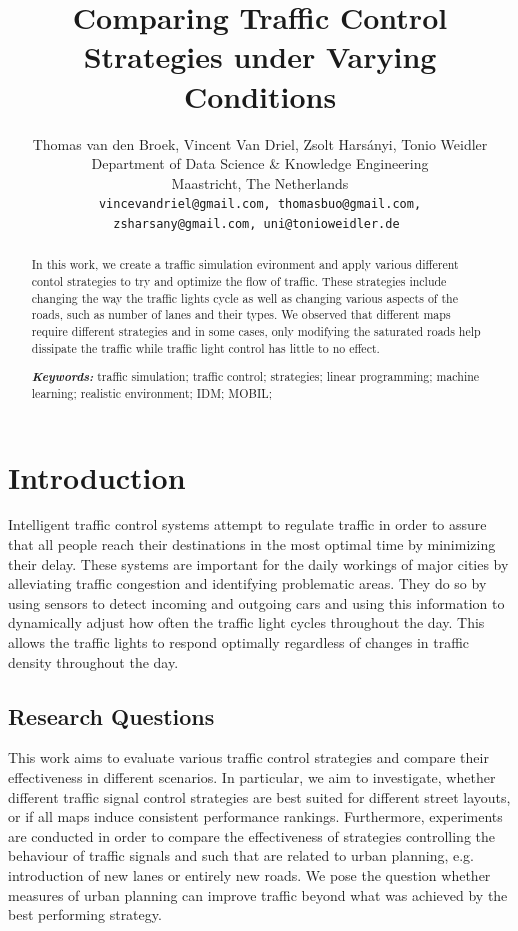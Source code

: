 \documentclass[11pt]{article}
\title{Comparing Traffic Control Strategies under Varying Conditions}
\author{Thomas van den Broek, Vincent Van Driel, Zsolt Harsányi, Tonio Weidler\\
	Department of Data Science \& Knowledge Engineering\\
	Maastricht, The Netherlands\\
	\tt \small vincevandriel@gmail.com, thomasbuo@gmail.com,\\
	\tt \small zsharsany@gmail.com, uni@tonioweidler.de
}
\begin{document}
\maketitle
\begin{abstract}
In this work, we create a traffic simulation evironment and apply various different contol strategies to try and optimize the flow of traffic. These strategies include changing the way the traffic lights cycle as well as changing various aspects of the roads, such as number of lanes and their types. We observed that different maps require different strategies and in some cases, only modifying the saturated roads help dissipate the traffic while traffic light control has little to no effect.

{{\it \bf Keywords:} traffic simulation; traffic control; strategies; linear programming; machine learning; realistic environment; IDM; MOBIL;}
\end{abstract}

\section{Introduction}
Intelligent traffic control systems attempt to regulate traffic in order to assure that all people reach their destinations in the most optimal time by minimizing their delay. These systems are important for the daily workings of major cities by alleviating traffic congestion and identifying problematic areas.  They do so by using sensors to detect incoming and outgoing cars and using this information to dynamically adjust how often the traffic light cycles throughout the day.  This allows the traffic lights to respond optimally regardless of changes in traffic density throughout the day.

\subsection{Research Questions}
This work aims to evaluate various traffic control strategies and compare their effectiveness in different scenarios. In particular, we aim to investigate, whether different traffic signal control strategies are best suited for different street layouts, or if all maps induce consistent performance rankings. Furthermore, experiments are conducted in order to compare the effectiveness of strategies controlling the behaviour of traffic signals and such that are related to urban planning, e.g. introduction of new lanes or entirely new roads. We pose the question whether measures of urban planning can improve traffic beyond what was achieved by the best performing strategy.
\end{document}
